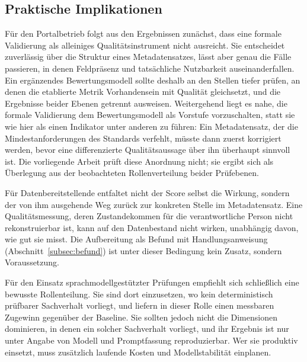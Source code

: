 \subsection{Praktische Implikationen}
Für den Portalbetrieb folgt aus den Ergebnissen zunächst, dass eine formale
Validierung als alleiniges Qualitätsinstrument nicht ausreicht. Sie entscheidet
zuverlässig über die Struktur eines Metadatensatzes, lässt aber genau die Fälle
passieren, in denen Feldpräsenz und tatsächliche Nutzbarkeit auseinanderfallen.
Ein ergänzendes Bewertungsmodell sollte deshalb an den Stellen tiefer prüfen, an
denen die etablierte Metrik Vorhandensein mit Qualität gleichsetzt, und die
Ergebnisse beider Ebenen getrennt ausweisen. Weitergehend liegt es nahe, die
formale Validierung dem Bewertungsmodell als Vorstufe vorzuschalten, statt sie
wie hier als einen Indikator unter anderen zu führen: Ein Metadatensatz, der die
Mindestanforderungen des Standards verfehlt, müsste dann zuerst korrigiert
werden, bevor eine differenzierte Qualitätsaussage über ihn überhaupt sinnvoll
ist. Die vorliegende Arbeit prüft diese Anordnung nicht; sie ergibt sich als
Überlegung aus der beobachteten Rollenverteilung beider Prüfebenen.

Für Datenbereitstellende entfaltet nicht der Score selbst die Wirkung, sondern der
von ihm ausgehende Weg zurück zur konkreten Stelle im Metadatensatz. Eine Qualitätsmessung,
deren Zustandekommen für die verantwortliche Person nicht rekonstruierbar ist,
kann auf den Datenbestand nicht wirken, unabhängig davon, wie gut sie misst. Die
Aufbereitung als Befund mit Handlungsanweisung
(Abschnitt~\ref{subsec:befund}) ist unter dieser Bedingung kein Zusatz, sondern
Voraussetzung.

Für den Einsatz sprachmodellgestützter Prüfungen empfiehlt sich schließlich eine
bewusste Rollenteilung. Sie sind dort einzusetzen, wo kein deterministisch prüfbarer Sachverhalt vorliegt,
und liefern in dieser Rolle einen messbaren Zugewinn gegenüber der Baseline. Sie sollten jedoch nicht die Dimensionen dominieren, in
denen ein solcher Sachverhalt vorliegt, und ihr Ergebnis ist nur unter Angabe von
Modell und Promptfassung reproduzierbar. Wer sie produktiv einsetzt, muss
zusätzlich laufende Kosten und Modellstabilität einplanen.
